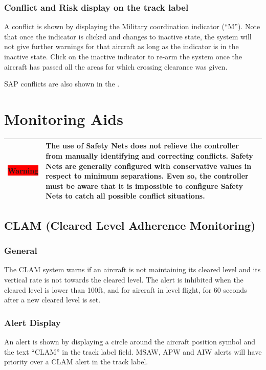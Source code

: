 \documentclass[a4paper,oneside,11pt]{memoir}
\newcommand{\tagref}[1]{\textit{\hyperref[#1]{\StrDel{#1}{tag:}}}}
\newcommand{\winref}[1]{\textit{\titleref{#1}}}
\newcommand{\warn}[1]{
  \begin{center}
    
    \begin{tabular}{| P{1.5cm}|p{10.5cm} |}
      \hline
      \cellcolor{shadecolor}\colorbox{red}{\color{white}Warning} &\cellcolor{shadecolor} #1 \\ \hline
    \end{tabular}
  \end{center}
}
\begin{document}
\subsubsection*{Conflict and Risk display on the track label}

A conflict is shown by displaying the Military coordination indicator (“M”). Note that once the indicator is clicked and changes to inactive state, the system will not give further warnings for that aircraft as long as the indicator is in the inactive state. Click on the inactive indicator to re-arm the system once the aircraft has passed all the areas for which crossing clearance was given.

\bigskip

SAP conflicts are also shown in the \winref{win:sap}.

\section{Monitoring Aids}

\warn{The use of Safety Nets does not relieve the controller from manually identifying and correcting conflicts. Safety Nets are generally configured with conservative values in respect to minimum separations. Even so, the controller must be aware that it is impossible to configure Safety Nets to catch all possible conflict situations.}


\subsection{CLAM (Cleared Level Adherence Monitoring)}
\label{tool:CLAM}
\subsubsection*{General}

The CLAM system warns if an aircraft is not maintaining its cleared level and its vertical rate is not towards the cleared level. The alert is inhibited when the cleared level is lower than 100ft, and for aircraft in level flight, for 60 seconds after a new cleared level is set.

\subsubsection*{Alert Display}

An alert is shown by displaying a circle around the aircraft position symbol and the text “CLAM” in the \tagref{tag:ALRT} track label field. MSAW, APW and AIW alerts will have priority over a CLAM alert in the track label.
\end{document}
